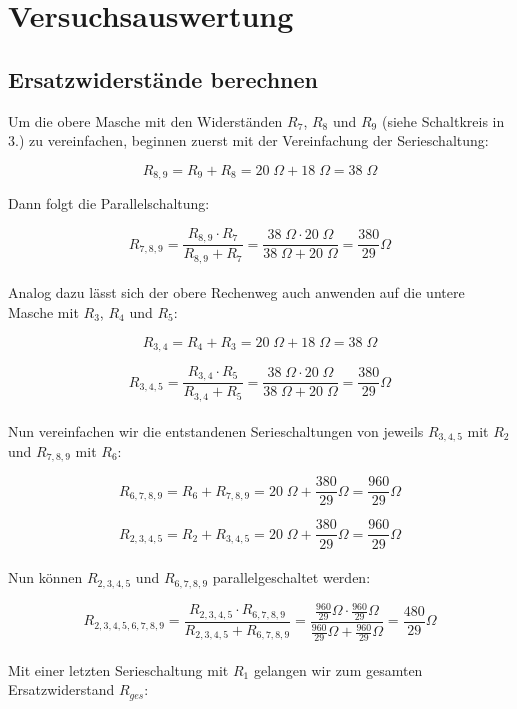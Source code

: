 \documentclass[a4paper,12pt]{article}
\begin{document}
\newpage

\section{Versuchsauswertung}

\subsection{Ersatzwiderstände berechnen}

Um die obere Masche mit den Widerständen $R_7$, $R_8$ und $R_9$ (siehe Schaltkreis in 3.) zu vereinfachen, beginnen zuerst mit der Vereinfachung der Serieschaltung:

$$R_{8,9} = R_9 + R_8 = 20\;\Omega + 18 \;\Omega = 38 \;\Omega$$

Dann folgt die Parallelschaltung:

$$R_{7,8,9} = \frac{R_{8,9} \cdot R_7}{R_{8,9} + R_7} = \frac{38 \;\Omega \cdot 20\; \Omega}{38\; \Omega + 20\; \Omega} = \frac{380}{29}\Omega$$\\

Analog dazu lässt sich der obere Rechenweg auch anwenden auf die untere Masche mit $R_3$, $R_4$ und $R_5$:  

$$R_{3,4} = R_4 + R_3 = 20 \;\Omega + 18 \;\Omega = 38 \;\Omega$$

$$R_{3,4,5} = \frac{R_{3,4} \cdot R_5}{R_{3,4} + R_5} = \frac{38\; \Omega \cdot 20\; \Omega}{38\; \Omega + 20\; \Omega} = \frac{380}{29}\Omega$$\\

Nun vereinfachen wir die entstandenen Serieschaltungen von jeweils $R_{3,4,5}$ mit $R_2$ und $R_{7,8,9}$ mit $R_6$:

$$R_{6,7,8,9} = R_6 + R_{7,8,9} = 20\; \Omega + \frac{380}{29} \Omega = \frac{960}{29} \Omega$$

$$R_{2,3,4,5} = R_2 + R_{3,4,5} = 20\; \Omega + \frac{380}{29} \Omega = \frac{960}{29} \Omega$$\\

Nun können $R_{2,3,4,5}$ und $R_{6,7,8,9}$ parallelgeschaltet werden:

$$R_{2,3,4,5,6,7,8,9} = \frac{R_{2,3,4,5} \cdot R_{6,7,8,9}}{R_{2,3,4,5} + R_{6,7,8,9}} = \frac{\frac{960}{29}\Omega \cdot \frac{960}{29}\Omega}{\frac{960}{29}\Omega + \frac{960}{29}\Omega} = \frac{480}{29}\Omega$$\\

Mit einer letzten Serieschaltung mit $R_1$ gelangen wir zum gesamten Ersatzwiderstand $R_{ges}$:
\end{document}
